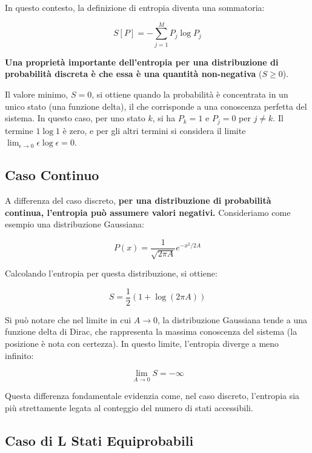In questo contesto, la definizione di entropia diventa una sommatoria:

\begin{equation}
S[P] = - \sum_{j=1}^{M} P_j \log P_j
\end{equation}

\textbf{Una proprietà importante dell'entropia per una distribuzione di probabilità discreta è che essa è una quantità non-negativa} ($S \ge 0$). 

Il valore minimo, $S=0$, si ottiene quando la probabilità è concentrata in un unico stato (una funzione delta), il che corrisponde a una conoscenza perfetta del sistema. In questo caso, per uno stato $k$, si ha $P_k=1$ e $P_j=0$ per $j \ne k$. Il termine $1 \log 1$ è zero, e per gli altri termini si considera il limite $\lim_{\epsilon \to 0} \epsilon \log \epsilon = 0$.

\subsection{Caso Continuo}

A differenza del caso discreto, \textbf{per una distribuzione di probabilità continua, l'entropia può assumere valori negativi.} Consideriamo come esempio una distribuzione Gaussiana:

\begin{equation}
P(x) = \frac{1}{\sqrt{2\pi A}} e^{-x^2 / 2A}
\end{equation}

Calcolando l'entropia per questa distribuzione, si ottiene:

\begin{equation}
S = \frac{1}{2}(1 + \log(2\pi A))
\end{equation}

Si può notare che nel limite in cui $A \to 0$, la distribuzione Gaussiana tende a una funzione delta di Dirac, che rappresenta la massima conoscenza del sistema (la posizione è nota con certezza). In questo limite, l'entropia diverge a meno infinito:

\begin{equation}
\lim_{A \to 0} S = -\infty
\end{equation}

Questa differenza fondamentale evidenzia come, nel caso discreto, l'entropia sia più strettamente legata al conteggio del numero di stati accessibili.



\subsection{Caso di L Stati Equiprobabili}

